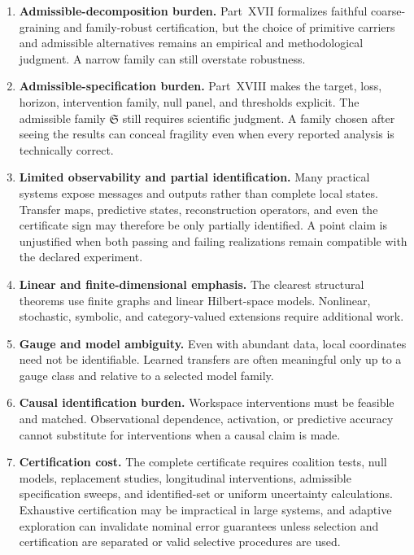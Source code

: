 \begin{enumerate}
\item \textbf{Admissible-decomposition burden.} Part~XVII formalizes faithful coarse-graining and
family-robust certification, but the choice of primitive carriers and admissible alternatives remains an
empirical and methodological judgment. A narrow family can still overstate robustness.

\item \textbf{Admissible-specification burden.} Part~XVIII makes the target, loss, horizon,
intervention family, null panel, and thresholds explicit. The admissible family \(\mathfrak S\) still
requires scientific judgment. A family chosen after seeing the results can conceal fragility even when
every reported analysis is technically correct.

\item \textbf{Limited observability and partial identification.} Many practical systems expose messages
and outputs rather than complete local states. Transfer maps, predictive states, reconstruction operators,
and even the certificate sign may therefore be only partially identified. A point claim is unjustified
when both passing and failing realizations remain compatible with the declared experiment.

\item \textbf{Linear and finite-dimensional emphasis.} The clearest structural theorems use finite graphs
and linear Hilbert-space models. Nonlinear, stochastic, symbolic, and category-valued extensions require
additional work.

\item \textbf{Gauge and model ambiguity.} Even with abundant data, local coordinates need not be
identifiable. Learned transfers are often meaningful only up to a gauge class and relative to a selected
model family.

\item \textbf{Causal identification burden.} Workspace interventions must be feasible and matched.
Observational dependence, activation, or predictive accuracy cannot substitute for interventions when a
causal claim is made.

\item \textbf{Certification cost.} The complete certificate requires coalition tests, null models,
replacement studies, longitudinal interventions, admissible specification sweeps, and identified-set or
uniform uncertainty calculations. Exhaustive certification may be impractical in large systems, and
adaptive exploration can invalidate nominal error guarantees unless selection and certification are
separated or valid selective procedures are used.


\end{enumerate}
